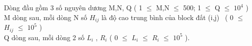 Dòng đầu gồm 3 số nguyên dương M,N, Q ( 1  $\le$  M,N  $\le$  500; 1  $\le$  Q  $\le$  $10^{4}$ )
\\M dòng sau, mỗi dòng N số $H_{ij}$ là độ cao trung bình của block đất (i,j)  ( 0  $\le$  $H_{ij}$  $\le$  $10^{5}$ )
\\Q dòng sau, mỗi dòng 2 số $L_{i}$ , $R_{i}$ ( 0  $\le$  $L_{i}$  $\le$  $R_{i}$  $\le$  $10^{5}$ ).